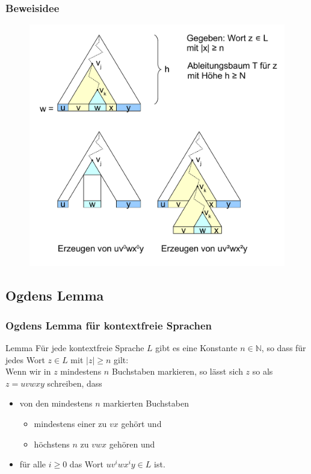 \begin{frame}
	\frametitle{Beweisidee}
	\begin{figure}[H]
		\centering
		\includegraphics[scale=0.5]{images/pumping}
	\end{figure}
\end{frame}

\subsection{Ogdens Lemma}
\begin{frame}
\frametitle{Ogdens Lemma für kontextfreie Sprachen}
\begin{exampleblock}{Lemma}
Für jede kontextfreie Sprache $L$
gibt es eine Konstante $n \in \mathbb{N}$, so dass für jedes Wort $z \in L$ mit $|z| \geq n$ gilt:\\
Wenn wir in $z$ mindestens $n$ Buchstaben markieren, so lässt sich $z$ so als $z = uvwxy$ schreiben, dass
\begin{itemize}
\item von den mindestens $n$ markierten Buchstaben
\begin{itemize}
\item mindestens einer zu $vx$ gehört und
\item höchstens $n$ zu $vwx$ gehören und
\end{itemize}
\item für alle $i \geq 0$ das Wort $uv^iwx^iy \in L$ ist.
\end{itemize}
\end{exampleblock}
\end{frame}

